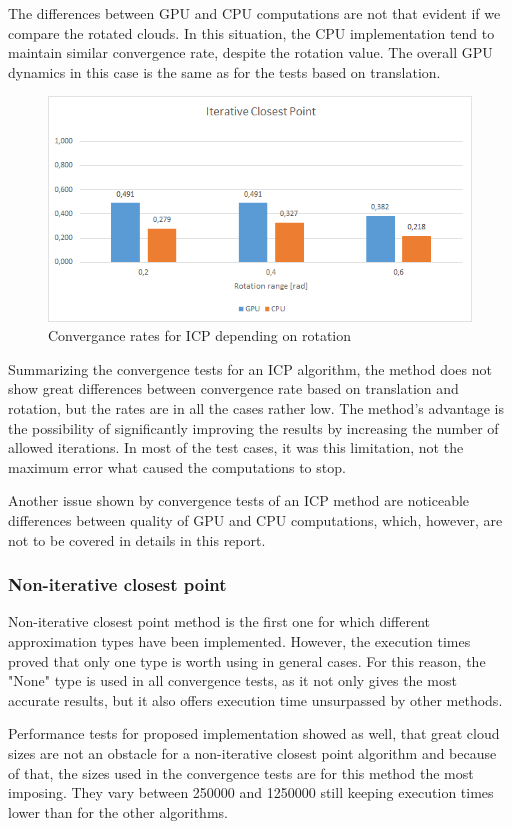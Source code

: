 \documentclass[titlepage]{article}
\begin{document}
The differences between GPU and CPU computations are not that evident if we compare the rotated clouds. In this situation, the CPU implementation tend to maintain similar convergence rate, despite the rotation value. The overall GPU dynamics in this case is the same as for the tests based on translation.
\begin{figure}[H]
\includegraphics[width=\textwidth]{ss-icp-3.png}
\caption{Convergance rates for ICP depending on rotation}
\end{figure}
Summarizing the convergence tests for an ICP algorithm, the method does not show great differences between convergence rate based on translation and rotation, but the rates are in all the cases rather low. The method's advantage is the possibility of significantly improving the results by increasing the number of allowed iterations. In most of the test cases, it was this limitation, not the maximum error what caused the computations to stop.

Another issue shown by convergence tests of an ICP method are noticeable differences between quality of GPU and CPU computations, which, however, are not to be covered in details in this report.

\subsubsection{Non-iterative closest point}
Non-iterative closest point method is the first one for which different approximation types have been implemented. However, the execution times proved that only one type is worth using in general cases. For this reason, the "None" type is used in all convergence tests, as it not only gives the most accurate results, but it also offers execution time unsurpassed by other methods.

Performance tests for proposed implementation showed as well, that great cloud sizes are not an obstacle for a non-iterative closest point algorithm and because of that, the sizes used in the convergence tests are for this method the most imposing. They vary between 250000 and 1250000 still keeping execution times lower than for the other algorithms.
\end{document}
